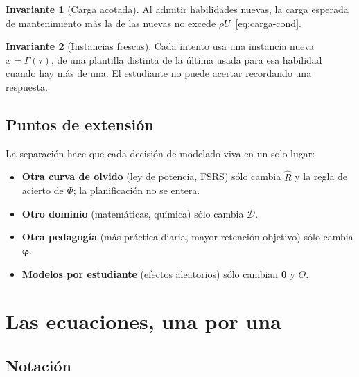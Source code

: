 \documentclass[11pt]{article}
\theoremstyle{definition}
\newtheorem{invariante}{Invariante}
\theoremstyle{remark}
\newcommand{\Rh}{\hat R}
\newcommand{\Dom}{\mathcal D}
\begin{document}
\begin{invariante}[Carga acotada]
Al admitir habilidades nuevas, la carga esperada de mantenimiento más la de las nuevas no excede $\rho U$~\eqref{eq:carga-cond}.
\end{invariante}

\begin{invariante}[Instancias frescas]
Cada intento usa una instancia nueva $x=\Gamma(\tau)$, de una plantilla distinta de la última usada para esa habilidad cuando hay más de una. El estudiante no puede acertar recordando una respuesta.
\end{invariante}

\subsection{Puntos de extensión}

La separación hace que cada decisión de modelado viva en un solo lugar:

\begin{itemize}
\item \textbf{Otra curva de olvido} (ley de potencia, FSRS) sólo cambia $\Rh$ y la regla de acierto de $\Phi$; la planificación no se entera.
\item \textbf{Otro dominio} (matemáticas, química) sólo cambia $\Dom$.
\item \textbf{Otra pedagogía} (más práctica diaria, mayor retención objetivo) sólo cambia $\bm\varphi$.
\item \textbf{Modelos por estudiante} (efectos aleatorios) sólo cambian $\bm\theta$ y $\Theta$.
\end{itemize}

\section{Las ecuaciones, una por una}
\label{sec:ecuaciones}

\subsection{Notación}
\end{document}
